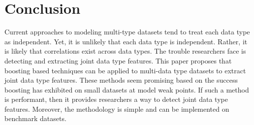 \chapter{Conclusion}

Current approaches to modeling multi-type datasets tend to treat each data type as independent.  Yet, it is unlikely that each data type is independent.  Rather, it is likely that correlations exist across data types.  The trouble researchers face is detecting and extracting joint data type features.  This paper proposes that boosting based techniques can be applied to multi-data type datasets to extract joint data type features.  These methods seem promising based on the success boosting has exhibited on small datasets at model weak points.  If such a method is performant, then it provides researchers a way to detect joint data type features.  Moreover, the methodology is simple and can be implemented on benchmark datasets.  





